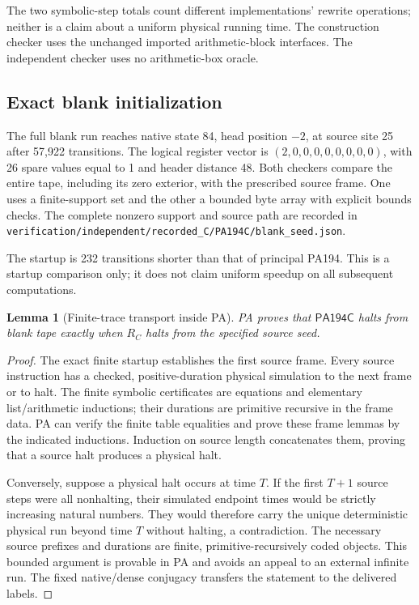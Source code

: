 \documentclass[11pt]{article}
\newtheorem{lemma}[theorem]{Lemma}
\newcommand{\M}{\mathsf{PA194C}}
\newcommand{\file}[1]{{\small\nolinkurl{#1}}}
\begin{document}
The two symbolic-step totals count different implementations' rewrite
operations; neither is a claim about a uniform physical running time.
The construction checker uses the unchanged imported arithmetic-block
interfaces. The independent checker uses no arithmetic-box oracle.

\subsection{Exact blank initialization}

The full blank run reaches native state 84, head position $-2$, at source
site 25 after 57,922 transitions. The logical register vector is
$(2,0,0,0,0,0,0,0,0)$, with 26 spare values equal to 1 and header distance
48. Both checkers compare the entire tape, including its zero exterior,
with the prescribed source frame. One uses a finite-support set and the
other a bounded byte array with explicit bounds checks. The complete
nonzero support and source path are recorded in
\file{verification/independent/recorded_C/PA194C/blank_seed.json}.

The startup is 232 transitions shorter than that of principal PA194.
This is a startup comparison only; it does not claim uniform speedup on
all subsequent computations.

\begin{lemma}[Finite-trace transport inside PA]
PA proves that $\M$ halts from blank tape exactly when $R_C$ halts from
the specified source seed.
\end{lemma}
\begin{proof}
The exact finite startup establishes the first source frame. Every source
instruction has a checked, positive-duration physical simulation to the
next frame or to halt. The finite symbolic certificates are equations
and elementary list/arithmetic inductions; their durations are primitive
recursive in the frame data. PA can verify the finite table equalities
and prove these frame lemmas by the indicated inductions. Induction on
source length concatenates them, proving that a source halt produces a
physical halt.

Conversely, suppose a physical halt occurs at time $T$. If the first
$T+1$ source steps were all nonhalting, their simulated endpoint times
would be strictly increasing natural numbers. They would therefore carry
the unique deterministic physical run beyond time $T$ without halting,
a contradiction. The necessary source prefixes and durations are finite,
primitive-recursively coded objects. This bounded argument is provable
in PA and avoids an appeal to an external infinite run. The fixed
native/dense conjugacy transfers the statement to the delivered labels.
\end{proof}
\end{document}
